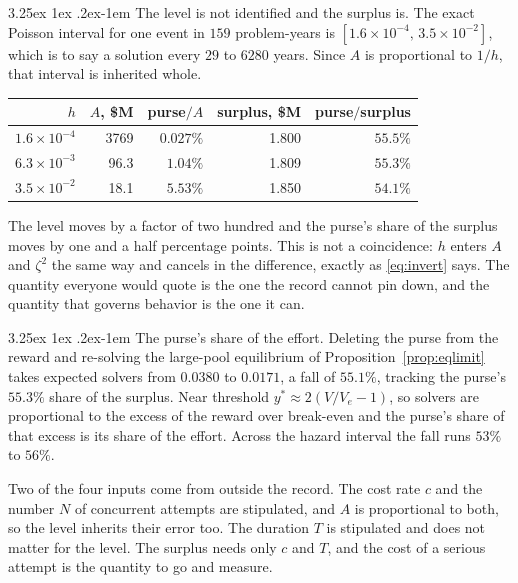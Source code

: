\documentclass[11pt]{article}
\makeatletter
\renewcommand\paragraph{\@startsection{paragraph}{4}{\z@}%
  {3.25ex \@plus1ex \@minus.2ex}{-1em}%
  {\normalfont\normalsize\itshape}}
\theoremstyle{itheads}
\makeatother
\begin{document}
\paragraph{The level is not identified and the surplus is.}
The exact Poisson interval for one event in $159$ problem-years is
$[1.6\times10^{-4},\,3.5\times10^{-2}]$, which is to say a solution every
$29$ to $6280$ years. Since $A$ is proportional to $1/h$, that interval is
inherited whole.

\begin{center}
\begin{tabular}{rrrrr}
\toprule
$h$ & $A$, \$M & purse${}/A$ & surplus, \$M & purse${}/$surplus\\
\midrule
$1.6\times10^{-4}$ & 3769 & $0.027\%$ & 1.800 & $55.5\%$\\
$6.3\times10^{-3}$ & 96.3 & $1.04\%$  & 1.809 & $55.3\%$\\
$3.5\times10^{-2}$ & 18.1 & $5.53\%$  & 1.850 & $54.1\%$\\
\bottomrule
\end{tabular}
\end{center}

The level moves by a factor of two hundred and the purse's share of the
surplus moves by one and a half percentage points. This is not a
coincidence: $h$ enters $A$ and $\zeta^{2}$ the same way and
cancels in the difference, exactly as \eqref{eq:invert} says. The quantity
everyone would quote is the one the record cannot pin down, and the quantity
that governs behavior is the one it can.

\paragraph{The purse's share of the effort.}
Deleting the purse from the reward and re-solving the large-pool equilibrium
of Proposition~\ref{prop:eqlimit} takes expected solvers from $0.0380$ to
$0.0171$, a fall of $55.1\%$, tracking the purse's $55.3\%$ share of the
surplus. Near threshold $y^{*}\approx2(V/V_{e}-1)$, so solvers are
proportional to the excess of the reward over break-even and the purse's
share of that excess is its share of the effort. Across the hazard interval
the fall runs $53\%$ to $56\%$.

Two of the four inputs come from outside the record. The cost rate $c$ and
the number $N$ of concurrent attempts are stipulated, and $A$ is
proportional to both, so the level inherits their error too. The duration
$T$ is stipulated and does not matter for the level. The surplus needs only
$c$ and $T$, and the cost of a serious attempt is the quantity to go and
measure.
\end{document}
